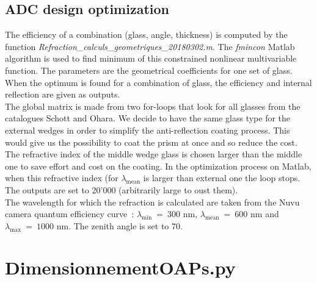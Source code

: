 \subsection{ADC design optimization}
The efficiency of a combination (glass, angle, thickness) is computed by the function \textit{Refraction\_calculs\_geometriques\_20180302.m}. The \textit{fmincon} Matlab algorithm is used to find minimum of this constrained nonlinear multivariable function. The parameters are the geometrical coefficients for one set of glass. When the optimum is found for a combination of glass, the efficiency and internal reflection are given as outputs.\\

The global matrix is made from two for-loops that look for all glasses from the catalogues Schott and Ohara. We decide to have the same glass type for the external wedges in order to simplify the anti-reflection coating process. This would give us the possibility to coat the prism at once and so reduce the cost. The refractive index of the middle wedge glass is chosen larger than the middle one to save effort and cost on the coating. In the optimization process on Matlab, when this refractive index (for $\lambda_\text{mean}$ is larger than external one the loop stops. The outputs are set to 20'000 (arbitrarily large to oust them).\\
The wavelength for which the refraction is calculated are taken from the Nuvu camera quantum efficiency curve~: $\lambda_\text{min}~=~300$ nm, $\lambda_\text{mean}~=~600$ nm and $\lambda_\text{max}~=~1000$ nm. The zenith angle is set to 70\degree.



\section{DimensionnementOAPs.py}\label{app:DimensionnementOAPs}














